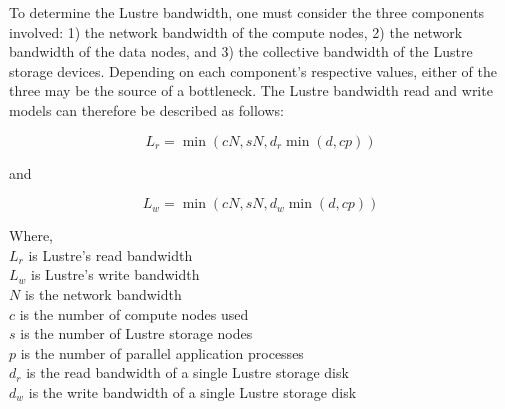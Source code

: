 
      To determine the Lustre bandwidth, one must consider the three components
  involved: 1) the network bandwidth of the compute nodes, 2) the network
  bandwidth of the data nodes, and 3) the collective bandwidth of the Lustre
  storage devices. Depending on each component's respective values, either of
  the three may be the source of a bottleneck. The Lustre bandwidth read and
  write models can therefore be described as follows:

    \begin{equation} %
        L_{r} = \min{(cN, sN, d_{r}\min{(d, cp)})}
    \end{equation}

    and


    \begin{equation}%
        L_{w} = \min{(cN, sN, d_{w}\min{(d, cp)})}
    \end{equation}

    Where, \\
    $L_{r}$ is Lustre's read bandwidth \\
    $L_{w}$ is Lustre's write bandwidth \\
    $N$ is the network bandwidth \\
    $c$ is the number of compute nodes used \\
    $s$ is the number of Lustre storage nodes \\
    $p$ is the number of parallel application processes \\
    $d_{r}$ is the read bandwidth of a single Lustre storage disk \\
    $d_{w}$ is the write bandwidth of a single Lustre storage disk \\


